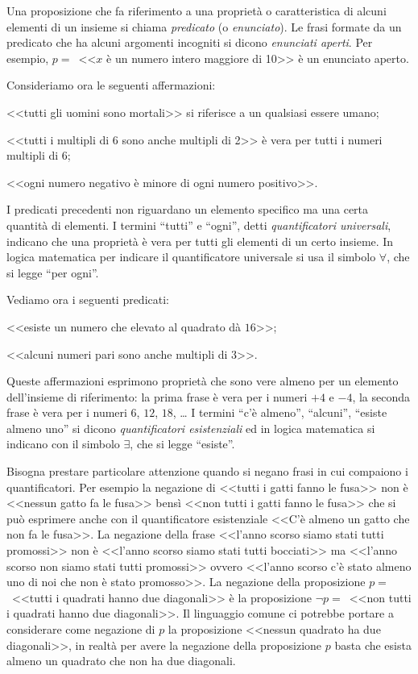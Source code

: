 Una proposizione che fa riferimento a una proprietà o caratteristica di alcuni elementi di un insieme si chiama \emph{predicato} (o \emph{enunciato}). Le frasi formate da un predicato che ha alcuni argomenti incogniti si dicono \emph{enunciati aperti}.
Per esempio, $p=$~<<$x$ è un numero intero maggiore di 10>> è un enunciato aperto.

Consideriamo ora le seguenti affermazioni:
\begin{itemize*}
\item <<tutti gli uomini sono mortali>> si riferisce a un qualsiasi essere umano;
\item <<tutti i multipli di 6 sono anche multipli di 2>> è vera per tutti i numeri multipli di 6;
\item <<ogni numero negativo è minore di ogni numero positivo>>.
\end{itemize*}
I predicati precedenti non riguardano un elemento specifico ma una certa quantità di elementi. I termini ``tutti'' e ``ogni'', detti \emph{quantificatori universali}, indicano che una proprietà è vera per tutti gli elementi di un certo insieme. In logica matematica per indicare il quantificatore universale si usa il simbolo $\forall$, che si legge ``per ogni''.

Vediamo ora i seguenti predicati:
\begin{itemize*}
\item <<esiste un numero che elevato al quadrato dà $16$>>;
\item <<alcuni numeri pari sono anche multipli di $3$>>.
\end{itemize*}
Queste affermazioni esprimono proprietà che sono vere almeno per un elemento dell'insieme di riferimento: la prima frase è vera per i numeri $+4$ e $-4$, la seconda frase è vera per i numeri $6$, $12$, $18$, \ldots{}
I termini ``c'è almeno'', ``alcuni'', ``esiste almeno uno'' si dicono \emph{quantificatori esistenziali} ed in logica matematica si indicano con il simbolo $\exists$, che si legge ``esiste''.

Bisogna prestare particolare attenzione quando si negano frasi in cui compaiono i quantificatori. Per esempio la negazione di <<tutti i gatti fanno le fusa>> non è <<nessun gatto fa le fusa>> bensì <<non tutti i gatti fanno le fusa>> che si può esprimere anche con il quantificatore esistenziale <<C'è almeno un gatto che non fa le fusa>>.
La negazione della frase <<l'anno scorso siamo stati tutti promossi>> non è <<l'anno scorso siamo stati tutti bocciati>> ma <<l'anno scorso non siamo stati tutti promossi>> ovvero <<l'anno scorso c'è stato almeno uno di noi che non è stato promosso>>.
La negazione della proposizione $p=$~<<tutti i quadrati hanno due diagonali>> è la proposizione ${\lnot}p=$~<<non tutti i quadrati hanno due diagonali>>.
Il linguaggio comune ci potrebbe portare a considerare come negazione di $p$ la proposizione <<nessun quadrato ha due diagonali>>, in realtà per avere la negazione della proposizione $p$ basta che esista almeno un quadrato che non ha due diagonali.

